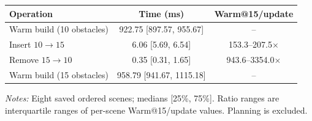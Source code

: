 \label{tab:tro-dynamic-update}
\scriptsize
\setlength{\tabcolsep}{2.0pt}
\renewcommand{\arraystretch}{0.95}
\begin{tabular}{@{}lcc@{}}
\toprule
Operation & Time (ms) & Warm@15/update \\
\midrule
Warm build (10 obstacles) & 922.75 [897.57, 955.67] & -- \\
Insert $10\!\to\!15$ & 6.06 [5.69, 6.54] & 153.3--207.5$\times$ \\
Remove $15\!\to\!10$ & 0.35 [0.31, 1.65] & 943.6--3354.0$\times$ \\
Warm build (15 obstacles) & 958.79 [941.67, 1115.18] & -- \\
\bottomrule
\end{tabular}
\par\vspace{0.1ex}
{\footnotesize\emph{Notes:} Eight saved ordered scenes; medians [25\%, 75\%]. Ratio ranges are interquartile ranges of per-scene Warm@15/update values. Planning is excluded.\par}
